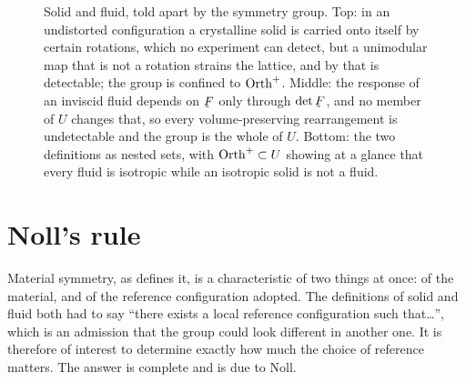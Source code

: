 \begin{figure}[htbp]
\caption{Solid and fluid, told apart by the symmetry group. Top: in an
undistorted configuration a crystalline solid is carried onto itself by
certain rotations, which no experiment can detect, but a unimodular map
that is not a rotation strains the lattice, and by  that is
detectable; the group is confined to $\operatorname{Orth}^{+}$. Middle: the response
of an inviscid fluid depends on $\bF$ only through $\det\bF$, and no
member of $U$ changes that, so every volume-preserving rearrangement is
undetectable and the group is the whole of $U$. Bottom: the two
definitions as nested sets, with $\operatorname{Orth}^{+}\subset U$ showing at a
glance that every fluid is isotropic while an isotropic solid is not a
fluid.}
\label{fig:ch8solidfluid}
\end{figure}

\section{Noll's rule}\label{sec:ch8noll}

Material symmetry, as  defines it, is a characteristic of two
things at once: of the material, and of the reference configuration
adopted. The definitions of solid and fluid both had to say ``there
exists a local reference configuration such that\ldots'', which is an
admission that the group could look different in another one. It is
therefore of interest to determine exactly how much the choice of
reference matters. The answer is complete and is due to Noll.

